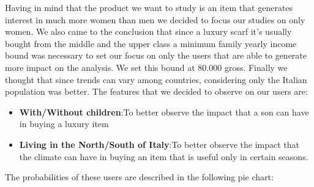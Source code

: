 Having in mind that the product we want to study is an item that generates interest in much more women than men we decided to focus our studies on only women. We also came to the conclusion that since a luxury scarf it's usually bought from the middle and the upper class a minimum family yearly income bound was necessary to set our focus on only the users that are able to generate more impact on the analysis. We set this bound at 80.000 \EUR{} gross. Finally we thought that since trends can vary among countries, considering only the Italian population was better.
The features that we decided to observe on our users are:
\begin{itemize}
	\item \textbf{With/Without children}:\@ To better observe the impact that a son can have in buying a luxury item
	\item \textbf{Living in the North/South of Italy}:\@ To better observe the impact that the climate can have in buying an item that is useful only in certain seasons.
\end{itemize}
The probabilities of these users are described in the following pie chart:
